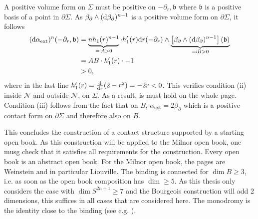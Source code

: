 A positive volume form on $\Sigma$ must be positive on $- \partial_r, \mathfrak{b}$ where $\mathfrak{b}$ is a positive basis of a point in $\partial \Sigma$.
As $\beta_\partial \wedge (\mathrm{d} \beta_\partial)^{n-1}$ is a positive volume form on $\partial \Sigma$, it follows
\begin{align*}
    (\mathrm{d} \alpha_\text{ext})^n(- \partial_r, \mathfrak{b}) &= \underbrace{n h_1(r)^{n-1}}_{\eqqcolon A > 0} \cdot h_1'(r) \mathrm{d} r(-\partial_r) \wedge \underbrace{\left[\beta_\partial \wedge (\mathrm{d} \beta_\partial)^{n-1}\right](\mathfrak{b})}_{\eqqcolon B > 0}\\
    &= AB \cdot h_1'(r) \cdot -1\\
    &> 0,
\end{align*}
where in the last line $h_1'(r) = \frac{\mathrm{d}}{\mathrm{d} r}(2 - r^2) = -2r < 0$.
This verifies condition (ii) inside $\mathcal{N}$ and outside $\mathcal{N}$, on $\Sigma$. As a result, is must hold on the whole page.
Condition (iii) follows from the fact that on $B$, $\alpha_\text{ext} = 2 \beta_\partial$ which is a positive contact form on $\partial \Sigma$ and therefore also on $B$.

This concludes the construction of a contact structure supported by a starting open book.
As this construction will be applied to the Milnor open book, one musg check that it satisfies all requirements for the construction.
Every open book is an abstract open book. For the Milnor open book, the pages are Weinstein and in particular Liouville.
The binding is connected for $\dim B \geq 3$, i.e. as soon as the open book composition has $\dim \geq 5$.
As this thesis only considers the case with $\dim S^{2n+1} \geq 7$ and the Bourgeois construction will add 2 dimensions, this suffices
in all cases that are considered here. 
The monodromy is the identity close to the binding (see e.g. \cite[section 4.2]{KvK16}).